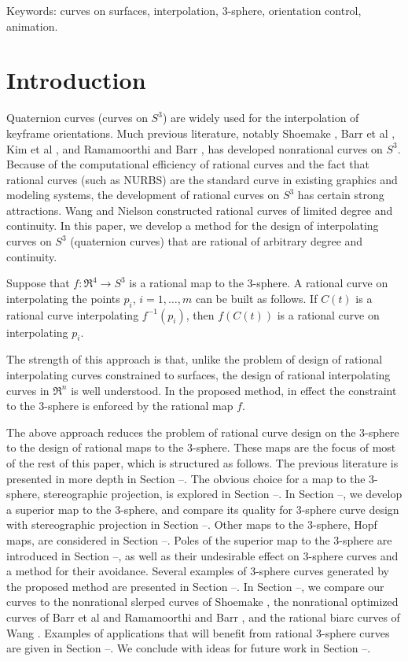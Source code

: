 Keywords: curves on surfaces, interpolation, 3-sphere,
	  orientation control, animation.

\clearpage


\section{Introduction}
\label{sec:intro}

Quaternion curves (curves on $S^3$) are widely used for
the interpolation of keyframe orientations.
Much previous literature, notably Shoemake \cite{}, Barr et al \cite{},
Kim et al \cite{}, and Ramamoorthi and Barr \cite{},
has developed nonrational curves on $S^3$.
Because of the computational efficiency of rational curves
and the fact that rational curves (such as NURBS) are the standard
curve in existing graphics and modeling systems,
the development of rational curves on $S^3$ has certain strong attractions.
Wang \cite{} and Nielson \cite{} constructed rational curves 
of limited degree and continuity.
In this paper, we develop a method for the design of interpolating
curves on $S^3$ (quaternion curves)
that are rational of arbitrary degree and continuity.

Suppose that $f:\Re^4 \rightarrow S^3$ is a rational map to the 3-sphere.
A rational curve on  interpolating the points 
$p_i$, $i=1,\ldots,m$ can be built as follows.
If $C(t)$ is a rational curve interpolating $f^{-1}(p_i)$,
then $f(C(t))$ is a rational curve on  interpolating $p_i$.

The strength of this approach is that, unlike the problem 
of design of rational interpolating curves constrained to surfaces,
the design of rational interpolating curves in $\Re^n$ is well understood.
In the proposed method, in effect the constraint to the 3-sphere is
enforced by the rational map $f$.

The above approach reduces the problem of rational curve design on the 3-sphere
to the design of rational maps to the 3-sphere.
These maps are the focus of most of the rest of this paper,
which is structured as follows.
The previous literature is presented in more depth in Section --.
The obvious choice for a map to the 3-sphere, stereographic projection,
is explored in Section --.
In Section --, we develop a superior map to the 3-sphere,
and compare its quality for 3-sphere curve design with stereographic projection
in Section --.
Other maps to the 3-sphere, Hopf maps, are considered in Section --.
Poles of the superior map to the 3-sphere are introduced in Section --,
as well as their undesirable effect on 3-sphere curves
and a method for their avoidance.
Several examples of 3-sphere curves generated by the proposed method
are presented in Section --.
In Section --, we compare our curves to the nonrational 
slerped curves of Shoemake \cite{},
the nonrational optimized curves of Barr et al \cite{} 
and Ramamoorthi and Barr \cite{},
and the rational biarc curves of Wang \cite{}.
Examples of applications that will benefit from rational 3-sphere curves
are given in Section --.
We conclude with ideas for future work in Section --.

